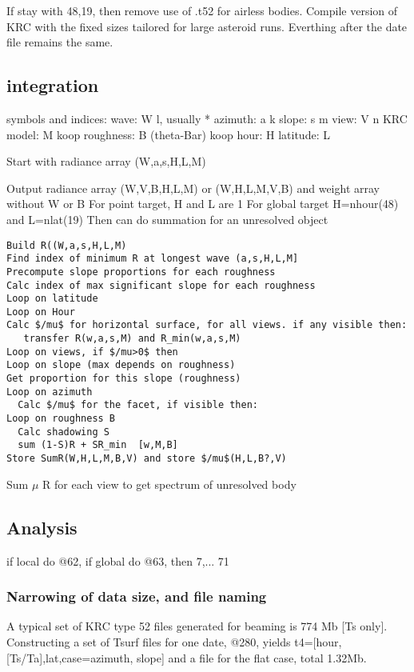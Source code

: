 \documentclass{article}
\begin{document}
If stay with 48,19, then remove use of .t52 for airless bodies. Compile version of KRC with the fixed sizes tailored for large asteroid runs. Everthing after the date file remains the same.

\subsection{integration}
symbols and indices:
\qi wave: W l, usually *
\qi azimuth: a k 
\qi slope: s m
\qi view:  V n
\qi KRC model: M koop
\qi roughness: B (theta-Bar) koop
\qi hour: H
\qi latitude: L

Start with radiance array (W,a,s,H,L,M)

Output radiance array (W,V,B,H,L,M) or (W,H,L,M,V,B)  and weight array without W or B
\qi For point target, H and L are 1
\qi For global target H=nhour(48) and L=nlat(19)
\qii Then can do summation for an unresolved object

\begin{verbatim}
Build R((W,a,s,H,L,M)
Find index of minimum R at longest wave (a,s,H,L,M]
Precompute slope proportions for each roughness
Calc index of max significant slope for each roughness
Loop on latitude
Loop on Hour
Calc $/mu$ for horizontal surface, for all views. if any visible then:
   transfer R(w,a,s,M) and R_min(w,a,s,M)
Loop on views, if $/mu>0$ then
Loop on slope (max depends on roughness)
Get proportion for this slope (roughness)
Loop on azimuth
  Calc $/mu$ for the facet, if visible then:
Loop on roughness B
  Calc shadowing S 
  sum (1-S)R + SR_min  [w,M,B]
Store SumR(W,H,L,M,B,V) and store $/mu$(H,L,B?,V)
\end{verbatim} 

Sum $\mu$ R for each view to get spectrum of unresolved body

\subsection{Analysis}

 if local do @62, if global do @63, then 7,... 71

\subsubsection{Narrowing of data size, and file naming}
A typical set of KRC type 52 files generated for beaming is 774 Mb [Ts
  only]. Constructing a set of Tsurf files for one date, @280, yields
t4=[hour,[Ts/Ta],lat,case=azimuth, slope] and a file for the flat case, total
1.32Mb. 
 
\end{document}
